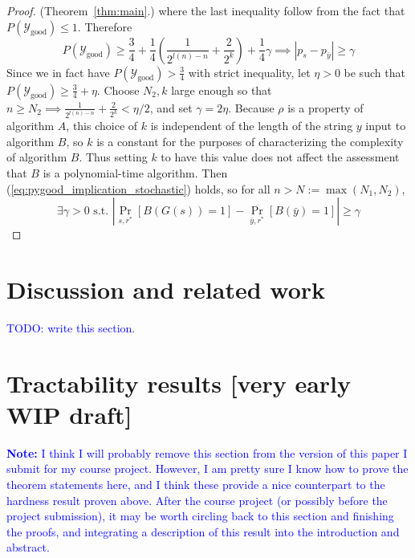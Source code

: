 \documentclass{article}
\def \Ygood{\mathcal{Y}_\text{good}}
\def \by{{\bar{y}}}
\theoremstyle{definition}
\theoremstyle{remark}
\begin{document}
\begin{proof}{(Theorem~\ref{thm:main}.)}
where the last inequality follow from the fact that $P(\Ygood) \leq 1$.
Therefore
\begin{equation} \label{eq:pygood_implication_stochastic}
P(\Ygood) \geq \frac{3}{4} + \frac{1}{4}(\frac{1}{2^{l(n) - n}} + \frac{2}{2^k}) + \frac{1}{4} \gamma \implies |p_s - p_\by| \geq \gamma
\end{equation}
Since we in fact have $P(\Ygood) > \frac{3}{4}$ with strict inequality, let $\eta > 0$ be such that $P(\Ygood) \geq \frac{3}{4} + \eta$.
Choose $N_2, k$ large enough so that $n \geq N_2 \implies \frac{1}{2^{l(n) - n}} + \frac{2}{2^k} < \eta/2$, and set $\gamma = 2\eta$.
Because $\rho$ is a property of algorithm $A$, this choice of $k$ is independent of the length of the string $y$ input to algorithm $B$, so $k$ is a constant for the purposes of characterizing the complexity of algorithm $B$.
Thus setting $k$ to have this value does not affect the assessment that $B$ is a polynomial-time algorithm.
Then (\ref{eq:pygood_implication_stochastic}) holds, so for all $n > N := \max(N_1, N_2)$,
$$
\exists \gamma > 0 \text{ s.t. } |\Pr_{s, r^*}[B(G(s)) = 1] - \Pr_{\by, r^*}[B(\by) = 1]| \geq \gamma
$$

\end{proof}

\section{Discussion and related work}

\textcolor{blue}{TODO: write this section.}

\section{Tractability results [very early WIP draft]}

\textcolor{blue}{
\textbf{Note:} I think I will probably remove this section from the version of this paper I submit for my course project.
However, I am pretty sure I know how to prove the theorem statements here, and I think these provide a nice counterpart to the hardness result proven above.
After the course project (or possibly before the project submission), it may be worth circling back to this section and finishing the proofs, and integrating a description of this result into the introduction and abstract.
}
\end{document}
